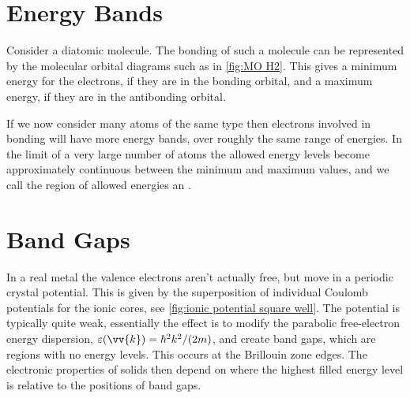 \documentclass[fleqn]{NotesClass}
\begin{document}
    \section{Energy Bands}
    Consider a diatomic molecule.
    The bonding of such a molecule can be represented by the molecular orbital diagrams such as in \cref{fig:MO H2}.
    This gives a minimum energy for the electrons, if they are in the bonding orbital, and a maximum energy, if they are in the antibonding orbital.
    
    If we now consider many atoms of the same type then electrons involved in bonding will have more energy bands, over roughly the same range of energies.
    In the limit of a very large number of atoms the allowed energy levels become approximately continuous between the minimum and maximum values, and we call the region of allowed energies an .
    
    \section{Band Gaps}
    In a real metal the valence electrons aren't actually free, but move in a periodic crystal potential.
    This is given by the superposition of individual Coulomb potentials for the ionic cores, see \cref{fig:ionic potential square well}.
    The potential is typically quite weak, essentially the effect is to modify the parabolic free-electron energy dispersion, \(\varepsilon(\vv{k}) = \hbar^2k^2/(2m)\), and create band gaps, which are regions with no energy levels.
    This occurs at the Brillouin zone edges.
    The electronic properties of solids then depend on where the highest filled energy level is relative to the positions of band gaps.
    
\end{document}
